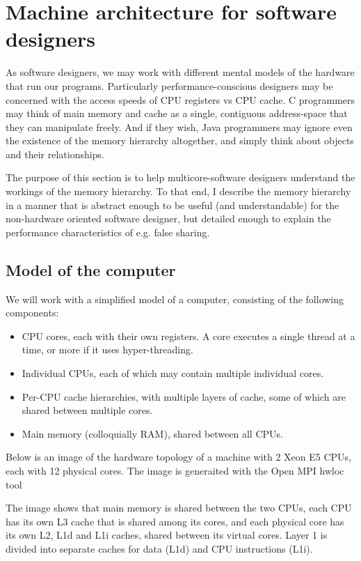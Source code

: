 \chapter{Machine architecture for software designers}
\label{chap:arch}
As software designers, we may work with different mental models of the hardware
that run our programs. Particularly performance-conscious designers may be
concerned with the access speeds of CPU registers vs CPU cache. C programmers
may think of main memory and cache as a single, contiguous address-space that
they can manipulate freely. And if they wish, Java programmers may ignore even
the existence of the memory hierarchy altogether, and simply think about objects
and their relationships.

The purpose of this section is to help multicore-software designers understand the
workings of the memory hierarchy. To that end, I describe the memory hierarchy
in a manner that is abstract enough to be useful (and understandable) for the
non-hardware oriented software designer, but detailed enough to explain the
performance characteristics of e.g. false sharing.

\section{Model of the computer}
We will work with a simplified model of a computer, consisting of the following
components:

\begin{itemize}
	\item CPU cores, each with their own registers. A core executes a single
		thread at a time, or more if it uses hyper-threading.
	\item Individual CPUs, each of which may contain multiple individual cores.
	\item Per-CPU cache hierarchies, with multiple layers of cache,
		some of which are shared between multiple cores.
	\item Main memory (colloquially RAM), shared between all CPUs.
\end{itemize}

Below is an image of the hardware topology of a machine with 2 Xeon E5 CPUs,
each with 12 physical cores. The image is generaited with the Open MPI hwloc tool



The image shows that main memory is shared between the two CPUs, each CPU has
its own L3 cache that is shared among its cores, and each physical core has its
own L2, L1d and L1i caches, shared between its virtual cores. Layer 1
is divided into separate caches for data (L1d) and CPU instructions (L1i).

